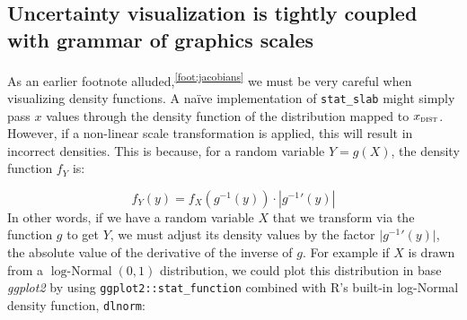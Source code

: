 \documentclass[journal]{vgtc}                     %
\begin{document}



\subsection{Uncertainty visualization is tightly coupled with grammar of graphics scales}
\label{sec:jacobians}

As an earlier footnote alluded,\textsuperscript{\ref{foot:jacobians}}   we must be very careful when visualizing density functions. A na\"{i}ve implementation of \texttt{stat\_slab} might simply pass $x$ values through the density function of the distribution mapped to $x_\textsc{dist}$. However, if a non-linear scale transformation is applied, this will result in incorrect densities. This is because, for a random variable $Y = g(X)$, the density function $f_Y$ is:

\[
f_Y(y) = f_X\left(g^{-1}(y)\right) \cdot \left| {g^{-1}}'(y) \right|
\]
In other words, if we have a random variable $X$ that we transform via the function $g$ to get $Y$, we must adjust its density values by the factor $\lvert {g^{-1}}'(y) \rvert$, the absolute value of the derivative of the inverse of $g$. For example if $X$ is drawn from a $\operatorname{log-Normal}(0, 1)$ distribution, we could plot this distribution in base \textit{ggplot2} by using \texttt{ggplot2::stat\_function} combined with R's built-in log-Normal density function, \texttt{dlnorm}:
\end{document}
